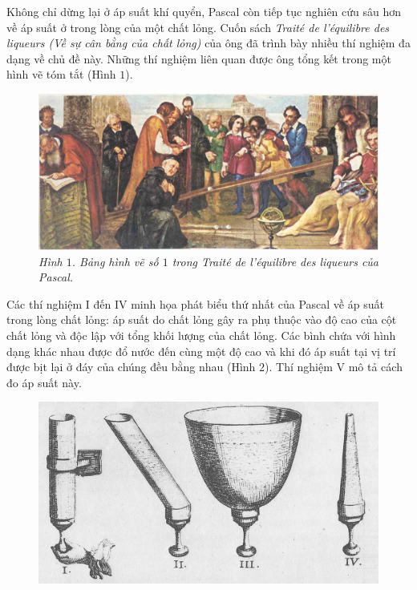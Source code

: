 \begin{multicols}{2}
	\vskip 0.1cm
	Không chỉ dừng lại ở áp suất khí quyển, Pascal còn tiếp tục nghiên cứu sâu hơn về áp suất ở trong lòng của một chất lỏng. Cuốn sách \textit{Traité de l’équilibre des liqueurs (Về sự cân bằng của chất lỏng)} của ông đã trình bày nhiều thí nghiệm đa dạng về chủ đề này. Những thí nghiệm liên quan được ông tổng kết trong một hình vẽ tóm tắt (Hình $1$).
	 \begin{figure}[H]
	 	\vspace*{-5pt}
	 	\centering
	 	\captionsetup{labelformat= empty, justification=centering}
	 	\includegraphics[width= 1\linewidth]{2}
	 	\caption{\small\textit{\color{timhieukhoahoc}Hình $1$. Bảng hình vẽ số $1$ trong Traité de l’équilibre des liqueurs của Pascal.}}
	 	\vspace*{-10pt}
	 \end{figure}
	Các thí nghiệm I đến IV minh họa phát biểu thứ nhất của Pascal về áp suất trong lòng chất lỏng: áp suất do chất lỏng gây ra phụ thuộc vào độ cao của cột chất lỏng và độc lập với tổng khối lượng của chất lỏng. Các bình chứa với hình dạng khác nhau được đổ nước đến cùng một độ cao và khi đó áp suất tại vị trí được bịt lại ở đáy của chúng đều bằng nhau (Hình $2$). Thí nghiệm V mô tả cách đo áp suất này.
	\begin{figure}[H]
		\vspace*{-5pt}
		\centering
		\captionsetup{labelformat= empty, justification=centering}
		\includegraphics[width= 1\linewidth]{3}

\end{figure}
\end{multicols}
